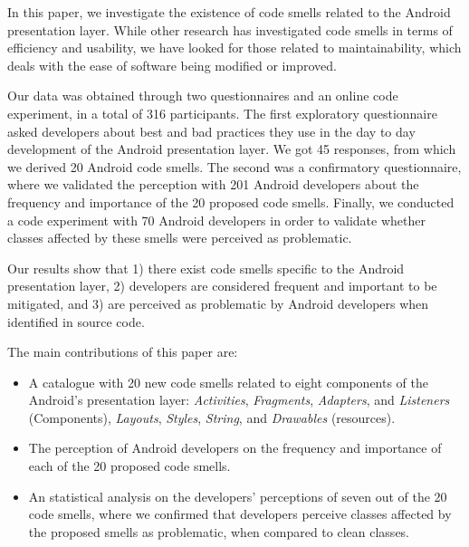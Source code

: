 In this paper, we investigate the existence of code smells related to the Android presentation layer. While other research has investigated code smells in terms of efficiency and usability, we have looked for those related to maintainability, which deals with the ease of software being modified or improved. 

Our data was obtained through two questionnaires and an online code experiment, in a total of 316 participants. The first exploratory questionnaire asked developers about best and bad practices they use in the day to day development of the Android presentation layer. We got 45 responses, from which we derived 20 Android code smells. The second was a confirmatory questionnaire, where we validated the perception with 201 Android developers about the frequency and importance of the 20 proposed code smells. Finally, we conducted a code experiment with 70 Android developers in order to validate whether classes affected by these smells were perceived as problematic.

Our results show that 1) there exist code smells specific to the Android presentation layer, 2) developers are considered frequent and important to be mitigated, and 3) are perceived as problematic by Android developers when identified in source code. 

The main contributions of this paper are:

\begin{itemize}
  \item A catalogue with 20 new code smells related to eight components of the Android's presentation layer: \textit{Activities}, \textit{Fragments}, \textit{Adapters}, and \textit{Listeners} (Components), \textit{Layouts}, \textit{Styles}, \textit{String}, and \textit{Drawables} (resources).
  
  \item The perception of Android developers on the frequency and importance of each of the 20 proposed code smells.

  \item An statistical analysis on the developers' perceptions of seven out of the 20 code smells, where we confirmed that developers perceive classes affected by the proposed smells as problematic, when compared to clean classes.
\end{itemize}


